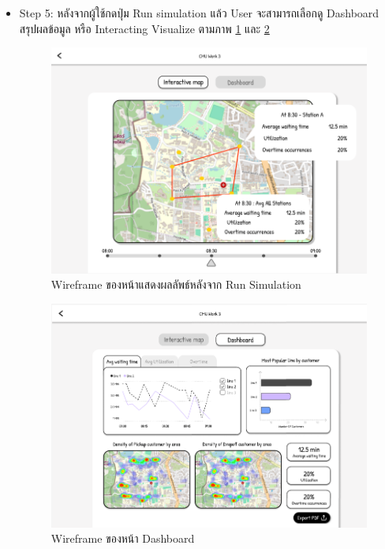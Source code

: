 \begin{mypara}
\begin{itemize}
    \item Step 5: หลังจากผู้ใช้กดปุ่ม Run simulation แล้ว User จะสามารถเลือกดู  Dashboard สรุปผลข้อมูล 
    หรือ Interacting Visualize ตามภาพ \ref{fig:WireframeOutputGuest} และ \ref{fig:WireframeDashboardGuest}
      \begin{figure}[H]
        \centering
        \includegraphics[scale=0.4]{output_show.png}
        \caption{Wireframe ของหน้าแสดงผลลัพธ์หลังจาก Run Simulation}
        \label{fig:WireframeOutputGuest}
      \end{figure} 

      \begin{figure}[H]
        \centering
        \includegraphics[scale=0.4]{dashboard.png}
        \caption{Wireframe ของหน้า Dashboard }
        \label{fig:WireframeDashboardGuest}
      \end{figure}
    

\end{itemize}
\end{mypara}
